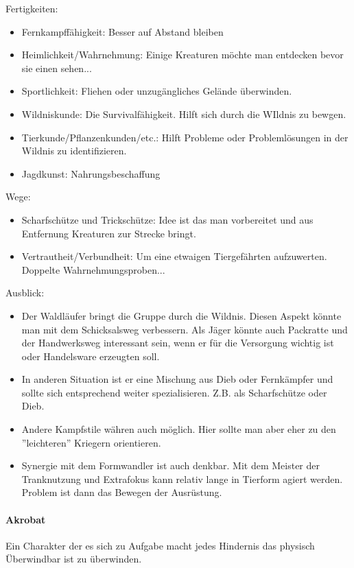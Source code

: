 \documentclass{article}
\begin{document}
Fertigkeiten:
\begin{itemize}
\item Fernkampffähigkeit: Besser auf Abstand bleiben
\item Heimlichkeit/Wahrnehmung: Einige Kreaturen möchte man entdecken bevor sie einen sehen...
\item Sportlichkeit: Fliehen oder unzugängliches Gelände überwinden.
\item Wildniskunde: Die Survivalfähigkeit. Hilft sich durch die WIldnis zu bewgen.
\item Tierkunde/Pflanzenkunden/etc.: Hilft Probleme oder Problemlösungen in der Wildnis zu identifizieren.
\item Jagdkunst: Nahrungsbeschaffung
\end{itemize}

Wege:
\begin{itemize}
\item Scharfschütze und Trickschütze: Idee ist das man vorbereitet und aus Entfernung Kreaturen zur Strecke bringt.
\item Vertrautheit/Verbundheit: Um eine etwaigen Tiergefährten aufzuwerten. Doppelte Wahrnehmungsproben...
\end{itemize}

Ausblick:
\begin{itemize}
\item Der Waldläufer bringt die Gruppe durch die Wildnis. Diesen Aspekt könnte man mit dem Schicksalsweg verbessern. Als Jäger könnte auch Packratte und der Handwerksweg interessant sein, wenn er für die Versorgung wichtig ist oder Handelsware erzeugten soll.
\item In anderen Situation ist er eine Mischung aus Dieb oder Fernkämpfer und sollte sich entsprechend weiter spezialisieren. Z.B. als Scharfschütze oder Dieb.
\item Andere Kampfstile währen auch möglich. Hier sollte man aber eher zu den ''leichteren'' Kriegern orientieren.
\item Synergie mit dem Formwandler ist auch denkbar. Mit dem Meister der Tranknutzung und Extrafokus kann relativ lange in Tierform agiert werden. Problem ist dann das Bewegen der Ausrüstung.
\end{itemize}

\paragraph{Akrobat}
Ein Charakter der es sich zu Aufgabe macht jedes Hindernis das physisch Überwindbar ist zu überwinden.
\end{document}
